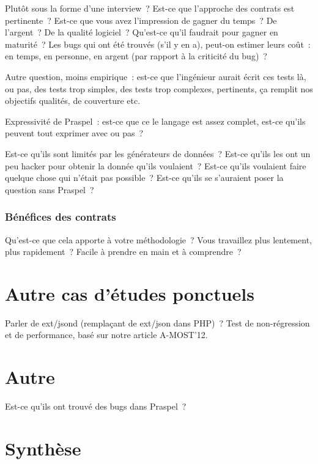 Plutôt sous la forme d'une interview~? Est-ce que l'approche des contrats est
pertinente~? Est-ce que vous avez l'impression de gagner du temps~? De
l'argent~? De la qualité logiciel~? Qu'est-ce qu'il faudrait pour gagner en
maturité~? Les bugs qui ont été trouvés (s'il y en a), peut-on estimer leurs
coût~: en temps, en personne, en argent (par rapport à la criticité du bug)~?

Autre question, moins empirique~: est-ce que l'ingénieur aurait écrit ces tests
là, ou pas, des tests trop simples, des tests trop complexes, pertinents, ça
remplit nos objectifs qualités, de couverture etc.

Expressivité de Praspel~: est-ce que ce le langage est assez complet, est-ce
qu'ils peuvent tout exprimer avec ou pas~?

Est-ce qu'ils sont limités par les générateurs de données~? Est-ce qu'ils les
ont un peu hacker pour obtenir la donnée qu'ils voulaient~? Est-ce qu'ils
voulaient faire quelque chose qui n'était pas possible~? Est-ce qu'ils se
s'auraient poser la question sans Praspel~?

\subsubsection{Bénéfices des contrats}

Qu'est-ce que cela apporte à votre méthodologie~? Vous travaillez plus
lentement, plus rapidement~? Facile à prendre en main et à comprendre~?

\section{Autre cas d'études ponctuels}

Parler de ext/jsond (remplaçant de ext/json dans PHP)~? Test de non-régression
et de performance, basé sur notre article A-MOST'12.

\section{Autre}

Est-ce qu'ils ont trouvé des bugs dans Praspel~?

\section{Synthèse}
\label{section:experimentation:other}
